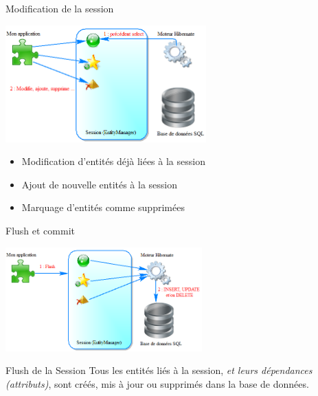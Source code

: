 \documentclass[compress]{beamer}%
\begin{document}
\begin{frame}{Modification de la session}
	
	\begin{center}
	\includegraphics[height=4.5cm]{images/with_orm_modify.png}	
	\end{center}
	
	\begin{itemize}
	\item Modification d'entités déjà liées à la session
	\item Ajout de nouvelle entités à la session
	\item Marquage d'entités comme supprimées
	\end{itemize}
	
\end{frame}

\begin{frame}{Flush et commit}
	
	\begin{center}
	\includegraphics[height=4cm]{images/with_orm_flush.png}	
	\end{center}
	
	\begin{block}{Flush de la Session}
	Tous les entités liés à la session, \emph{et leurs dépendances (attributs)}, sont créés, mis à jour ou supprimés dans la base de données.\\
	\end{block}
	
\end{frame}
\end{document}
